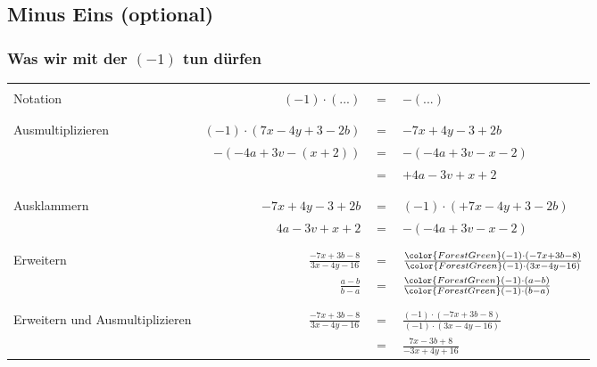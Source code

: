 
\newpage
\subsection{Minus Eins (optional)}

\subsubsection*{Was wir mit der $(-1)$ tun dürfen}

\begin{tabular}{p{5cm}|rcl}
  \hline\\
  Notation          & $(-1)\cdot(...)$                &$=$& $-(...)$                      \\
  \\
  \hline\\
  Ausmultiplizieren & $(-1)\cdot(7x-4y+3-2b)$              &$=$& $-7x + 4y -3 + 2b$            \\
                    & $-(-4a + 3v -(x+2))$            &$=$& $-(-4a +3v -x-2)$             \\
                    &                                 &$=$& $+4a -3v +x+2$                \\
  \\
  \hline\\
  Ausklammern       & $-7x +4y -3 +2b$                &$=$& $(-1)\cdot (+7x -4y + 3 -2b)$ \\
                    & $4a -3v + x +2$                 &$=$& $-(-4a + 3v -x -2)$           \\
  \\
  \hline\\
  Erweitern         & $\frac{-7x+3b -8}{3x - 4y -16}$ &$=$& $\frac{{\color{ForestGreen}(-1)}\cdot(-7x+3b -8)}{{\color{ForestGreen}(-1)}\cdot(3x - 4y -16)}$\\
                    & $\frac{a-b}{b-a}$               &$=$& $\frac{{\color{ForestGreen}(-1)}\cdot(a-b)}{{\color{ForestGreen}(-1)}\cdot(b-a)}$\\
  \\
  \hline\\                      
  Erweitern und Ausmultiplizieren  & $\frac{-7x+3b -8}{3x - 4y -16}$ &$=$& $\frac{(-1)\cdot(-7x+3b -8)}{(-1)\cdot(3x - 4y -16)}$\\
                    &                                 &$=$& $\frac{7x-3b+8}{-3x+4y+16}$\\

\end{tabular}
